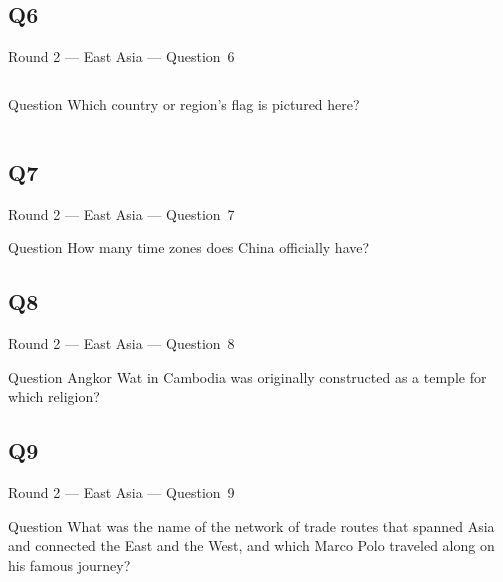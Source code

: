 \documentclass[11pt]{beamer}
\begin{document}
\subsection*{Q6}
\begin{frame}[t]{Round 2 --- East Asia --- \mbox{Question 6}}
\vspace{-0.5em}
\begin{columns}[T,totalwidth=\linewidth]
\begin{column}{0.32\linewidth}
\begin{block}{Question}
Which country or region's flag is pictured here?
\end{block}
\end{column}
\begin{column}{0.65\linewidth}
\begin{center}
\texttt{[image: \{Images/hongkong]}.png}
\end{center}
\end{column}
\end{columns}
\end{frame}
\subsection*{Q7}
\begin{frame}[t]{Round 2 --- East Asia --- \mbox{Question 7}}
\vspace{-0.5em}
\begin{block}{Question}
How many time zones does China officially have?
\end{block}
\end{frame}
\subsection*{Q8}
\begin{frame}[t]{Round 2 --- East Asia --- \mbox{Question 8}}
\vspace{-0.5em}
\begin{block}{Question}
Angkor Wat in Cambodia was originally constructed as a temple for which religion?
\end{block}
\end{frame}
\subsection*{Q9}
\begin{frame}[t]{Round 2 --- East Asia --- \mbox{Question 9}}
\vspace{-0.5em}
\begin{block}{Question}
What was the name of the network of trade routes that spanned Asia and connected the East and the West, and which Marco Polo traveled along on his famous journey?
\end{block}
\end{frame}
\end{document}
